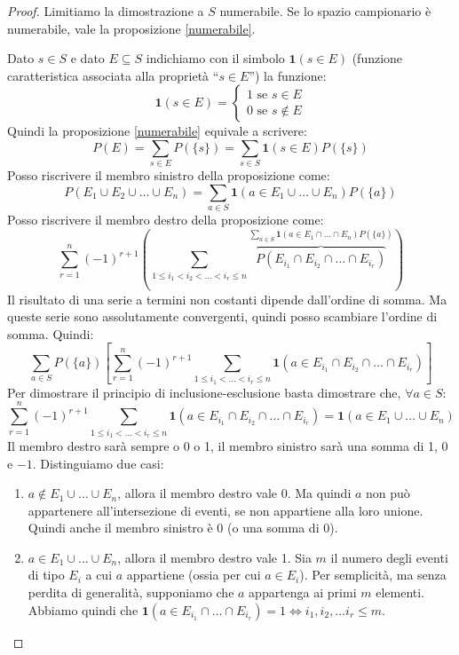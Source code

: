 \begin{proof}
Limitiamo la dimostrazione a $S$ numerabile. Se lo spazio campionario \`e numerabile, vale la proposizione \ref{numerabile}.

Dato $s \in S$ e dato $E \subseteq S$ indichiamo con il simbolo $\mathbf{1}(s \in E)$ (funzione caratteristica associata alla propriet\`a ``$s \in E$'') la funzione:
\[
\mathbf{1}(s \in E) =
\begin{cases}
1 \text{ se } s \in E \\
0 \text{ se } s \notin E 
\end{cases}
\]
Quindi la proposizione \ref{numerabile} equivale a scrivere:
\[
P(E) = \sum_{s \in E} P(\{s\}) = \sum_{s \in S} \mathbf{1}(s \in E) P(\{s\})
\]
Posso riscrivere il membro sinistro della proposizione come:
\[
P(E_1 \cup E_2 \cup \dots \cup E_n) = 
\sum_{a \in S} \mathbf{1}(a \in E_1 \cup \dots \cup E_n) P(\{a\})
\]
Posso riscrivere il membro destro della proposizione come:
\[
\sum_{r = 1}^{n} (-1)^{r+1} 
\left(
\sum_{1 \le i_1 < i_2 < \dots < i_r \le n} 
\overbrace{
P(E_{i_1} \cap E_{i_2} \cap \dots \cap E_{i_r})
}^{ \sum_{a \in S} \mathbf{1}(a \in E_1 \cap \dots \cap E_n) P(\{a\}) }
\right) 
\]
Il risultato di una serie a termini non costanti dipende dall'ordine di somma. Ma queste serie sono assolutamente convergenti, quindi posso scambiare l'ordine di somma. Quindi:
\[
\sum_{a \in S} P(\{a\}) \left[ \sum_{r = 1}^n (-1)^{r+1} \sum_{1 \le i_1 < \dots < i_r \le n} \mathbf{1}(a \in E_{i_1} \cap E_{i_2} \cap \dots \cap E_{i_r}) \right]
\]
Per dimostrare il principio di inclusione-esclusione basta dimostrare che, $\forall  a \in S$:
\[
\sum_{r = 1}^n (-1)^{r+1} \sum_{1 \le i_1 < \dots < i_r \le n} \mathbf{1}(a \in E_{i_1} \cap E_{i_2} \cap \dots \cap E_{i_r}) = \mathbf{1}(a \in E_1 \cup \dots \cup E_n)
\]
Il membro destro sar\`a sempre o 0 o 1, il membro sinistro sar\`a una somma di 1, 0 e $-1$. Distinguiamo due casi:
\begin{enumerate}
    \item $a \notin E_1 \cup \dots \cup E_n$, allora il membro destro vale 0. Ma quindi $a$ non pu\`o appartenere all'intersezione di eventi, se non appartiene alla loro unione. Quindi anche il membro sinistro \`e 0 (o una somma di 0).
    \item $a \in E_1 \cup \dots \cup E_n$, allora il membro destro vale 1. Sia $m$ il numero degli eventi di tipo $E_i$ a cui $a$ appartiene (ossia per cui $a \in E_i$). Per semplicit\`a, ma senza perdita di generalit\`a, supponiamo che $a$ appartenga ai primi $m$ elementi. Abbiamo quindi che $\mathbf{1}(a \in E_{i_1} \cap \dots \cap E_{i_r}) = 1 \Leftrightarrow i_1, i_2, \dots i_r \le m$.


\end{enumerate}
\end{proof}
